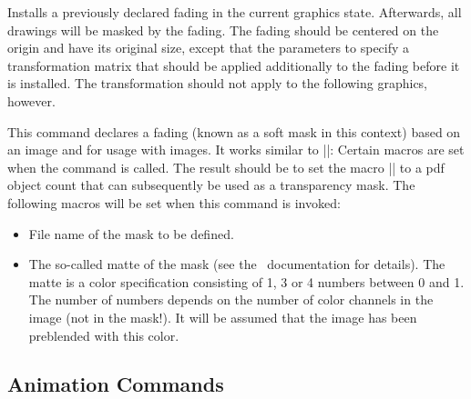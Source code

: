 \begin{command}{\pgfsys@usefading{}}
  Installs a previously declared fading  in the current
  graphics state. Afterwards, all drawings will be masked by the
  fading. The fading should be centered on the origin and have its
  original size, except that the parameters  to 
  specify a transformation matrix that should be applied additionally
  to the fading before it is installed. The transformation should not
  apply to the following graphics, however.
\end{command}


\begin{command}{\pgfsys@definemask}
  This command declares a fading (known as a soft mask in this
  context) based on an image and for usage with images. It
  works similar to |\pgfsys@defineimage|: Certain macros are set when
  the command is called. The result should be to set the macro
  |\pgf@mask| to a pdf object count that can subsequently be used as a
  transparency mask. The following macros will be set when this command is
  invoked:

  \begin{itemize}
  \item \declare{|\pgf@filename|}
    File name of the mask to be defined.

  \item \declare{|\pgf@maskmatte|}
    The so-called matte of the mask (see the \pdf\ documentation for
    details). The matte is a color specification consisting of 1, 3 or
    4 numbers between 0 and 1. The number of numbers depends on the
    number of color channels in the image (not in the mask!). It will
    be assumed that the image has been preblended with this color.
  \end{itemize}
\end{command}


\subsection{Animation Commands}

\def\animationtimingexample#1#2#3{ 
  \tikz[fill=blue!25, draw=blue, ultra thick] {
    \pgfidrefnextuse{\objid}{#1}
    \pgfsys@animation@whom{\objid}{#2}
    \pgfidrefnextuse{\nodeid}{node}
    \pgfsys@animation@event{\nodeid}{}{click}{}{begin}
    #3
    \node [font=\scriptsize, circle, fill, draw, align=center]
      (node) {Click \\ here};
  }
}
\def\animationexample#1#2#3{
  \animationtimingexample{#1}{#2}{
    \pgfsys@animation@time{0}{1}{1}{0}{0}
    \pgfsys@animation@val@current
    \pgfsys@animation@time{2}{1}{1}{0}{0}
    #3
  }
}


